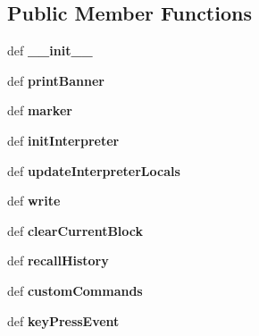 \subsection*{Public Member Functions}
\begin{DoxyCompactItemize}
\item 
\hypertarget{classpyfrp__term_1_1PyInterp_ad73f485e863d4b6704bc2b56accafc96}{def {\bfseries \+\_\+\+\_\+init\+\_\+\+\_\+}}\label{classpyfrp__term_1_1PyInterp_ad73f485e863d4b6704bc2b56accafc96}

\item 
\hypertarget{classpyfrp__term_1_1PyInterp_a8e7809ec844863d5b335b795d2ab78c5}{def {\bfseries print\+Banner}}\label{classpyfrp__term_1_1PyInterp_a8e7809ec844863d5b335b795d2ab78c5}

\item 
\hypertarget{classpyfrp__term_1_1PyInterp_a3be4dd9eff91571dbf0c32ac42bc069a}{def {\bfseries marker}}\label{classpyfrp__term_1_1PyInterp_a3be4dd9eff91571dbf0c32ac42bc069a}

\item 
\hypertarget{classpyfrp__term_1_1PyInterp_af3e62bf2e6ca1db533698f3cad5afc95}{def {\bfseries init\+Interpreter}}\label{classpyfrp__term_1_1PyInterp_af3e62bf2e6ca1db533698f3cad5afc95}

\item 
\hypertarget{classpyfrp__term_1_1PyInterp_a03d5c97f73aa2e59ea497cb6cf904650}{def {\bfseries update\+Interpreter\+Locals}}\label{classpyfrp__term_1_1PyInterp_a03d5c97f73aa2e59ea497cb6cf904650}

\item 
\hypertarget{classpyfrp__term_1_1PyInterp_a6c7db193e8b60fdaa066fce652b4516f}{def {\bfseries write}}\label{classpyfrp__term_1_1PyInterp_a6c7db193e8b60fdaa066fce652b4516f}

\item 
\hypertarget{classpyfrp__term_1_1PyInterp_a7bd58066a97069f08e3bab0b04b1d76a}{def {\bfseries clear\+Current\+Block}}\label{classpyfrp__term_1_1PyInterp_a7bd58066a97069f08e3bab0b04b1d76a}

\item 
\hypertarget{classpyfrp__term_1_1PyInterp_a155dcabfbb5fe4726dd042feba91818d}{def {\bfseries recall\+History}}\label{classpyfrp__term_1_1PyInterp_a155dcabfbb5fe4726dd042feba91818d}

\item 
\hypertarget{classpyfrp__term_1_1PyInterp_aa4a790c4a1204dd86ddfb6db4aba3f82}{def {\bfseries custom\+Commands}}\label{classpyfrp__term_1_1PyInterp_aa4a790c4a1204dd86ddfb6db4aba3f82}

\item 
\hypertarget{classpyfrp__term_1_1PyInterp_a4669b4714516bd7453edec674c664252}{def {\bfseries key\+Press\+Event}}\label{classpyfrp__term_1_1PyInterp_a4669b4714516bd7453edec674c664252}

\end{DoxyCompactItemize}
